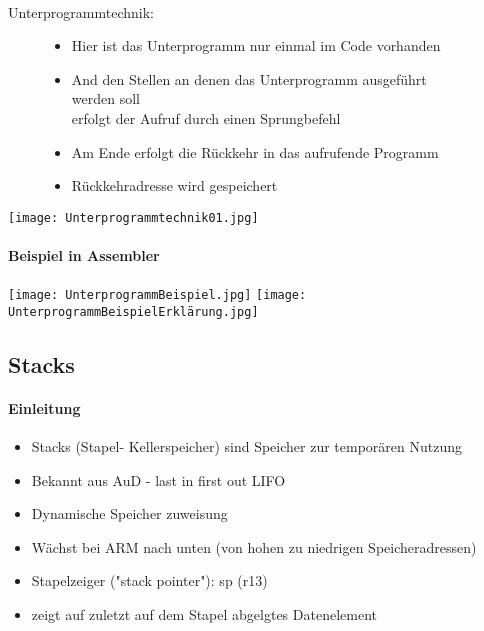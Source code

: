 		\paragraph{} Unterprogrammtechnik: \\
		\begin{minipage}{0.6\textwidth}
			\begin{figure}[H]
				\begin{itemize}
					\item Hier ist das Unterprogramm nur einmal im Code vorhanden
					\item And den Stellen an denen das Unterprogramm ausgeführt werden soll \\
							erfolgt der Aufruf durch einen Sprungbefehl
					\item Am Ende erfolgt die Rückkehr in das aufrufende Programm
					\item Rückkehradresse wird gespeichert
				\end{itemize}
			\end{figure}
		\end{minipage}
		\begin{minipage}{0.35\textwidth}
			\texttt{[image: Unterprogrammtechnik01.jpg]}
		\end{minipage}

		\paragraph{Beispiel in Assembler}
		\begin{center}
			\texttt{[image: UnterprogrammBeispiel.jpg]}
			\texttt{[image: UnterprogrammBeispielErklärung.jpg]}
		\end{center}
			

	\subsection{Stacks}
		\paragraph{Einleitung}
		\begin{itemize}
			\item Stacks (Stapel- Kellerspeicher) sind Speicher zur temporären Nutzung
			\item Bekannt aus AuD - last in first out LIFO
			\item Dynamische Speicher zuweisung
			\item Wächst bei ARM nach unten (von hohen zu niedrigen Speicheradressen)
			\item Stapelzeiger ("stack pointer"): sp (r13)
			\item zeigt auf zuletzt auf dem Stapel abgelgtes Datenelement
		\end{itemize}


